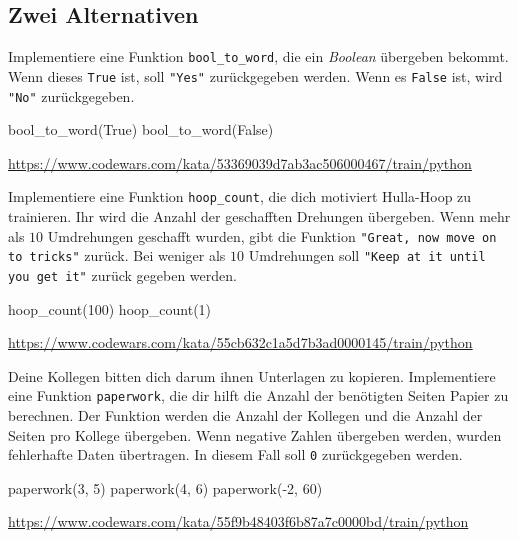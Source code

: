 \documentclass[class=scrartcl, crop=false]{standalone}
\begin{document}
\subsection{Zwei Alternativen}
\begin{aufgabe} \noindent
Implementiere eine Funktion \texttt{bool_to_word}, die ein \emph{Boolean} übergeben bekommt.
Wenn dieses \texttt{True} ist, soll \texttt{"Yes"} zurückgegeben werden. 
Wenn es \texttt{False} ist, wird \texttt{"No"} zurückgegeben. 

\begin{pyconsole}
bool_to_word(True)
bool_to_word(False)
\end{pyconsole}
	
\noindent\url{https://www.codewars.com/kata/53369039d7ab3ac506000467/train/python}
	
\end{aufgabe}
	

\begin{aufgabe} \noindent
Implementiere eine Funktion \texttt{hoop_count}, die dich motiviert Hulla-Hoop zu trainieren. Ihr wird die Anzahl der geschafften Drehungen übergeben. Wenn mehr als $10$ Umdrehungen geschafft wurden, gibt die Funktion \texttt{"Great, now move on to tricks"} zurück. Bei weniger als $10$ Umdrehungen soll \texttt{"Keep at it until you get it"} zurück gegeben werden.

\begin{pyconsole}
hoop_count(100)
hoop_count(1)
\end{pyconsole}

\noindent\url{https://www.codewars.com/kata/55cb632c1a5d7b3ad0000145/train/python}

\end{aufgabe}

\begin{aufgabe} \noindent
Deine Kollegen bitten dich darum ihnen Unterlagen zu kopieren.
Implementiere eine Funktion \texttt{paperwork}, die dir hilft die Anzahl der benötigten Seiten Papier zu berechnen. Der Funktion werden die Anzahl der Kollegen und die Anzahl der Seiten pro Kollege übergeben.
Wenn negative Zahlen übergeben werden, wurden fehlerhafte Daten übertragen. In diesem Fall soll \texttt{0} zurückgegeben werden.

\begin{pyconsole}
paperwork(3, 5)
paperwork(4, 6)
paperwork(-2, 60)
\end{pyconsole}

\noindent\url{https://www.codewars.com/kata/55f9b48403f6b87a7c0000bd/train/python}

\end{aufgabe}
\end{document}
